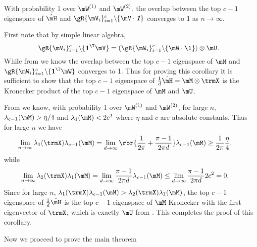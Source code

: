 \begin{corollary}
\label{cor:H-hat-eigenspace}
With probability 1 over $\mW^{(1)}$ and $\mW^{(2)}$, the overlap between the top $c-1$ eigenspace of $\hat\mH$ and $\gR\{\mV_i\}_{i=1}^c\backslash\{\mV\cdot\emph{\textbf{1}}\}$ converges to 1 as $n\to\infty$.
\end{corollary}
\begin{proofof}{}
First note that by simple linear algebra,
\begin{equation}
\gR\{\mV_i\}_{i=1}^c\backslash\{\textbf{1}^\T\mV\}=(\gR\{\mW_i\}_{i=1}^c\backslash\{\mW\cdot\1\})\otimes \mU.
\end{equation}
While from  we know the overlap between the top $c-1$ eigenspace of $\mM$ and $\gR\{\mW_i\}_{i=1}^c\backslash\{\textbf{1}^\T\mW\}$ converges to 1. Thus for proving this corollary it is sufficient to show that the top $c-1$ eigenspace of $\frac1d\hat\mH = \mM\otimes \trmX$ is the Kronecker product of the top $c-1$ eigenspace of $\mM$ and $\mU$.

From  we know, with probability 1 over $\mW^{(1)}$ and $\mW^{(2)}$, for large $n$, $\lambda_{c-1}(\mM)>\eta/4$ and $\lambda_1(\mM)<2c^2$ where $\eta$ and $c$ are absolute constants. Thus for large $n$ we have \begin{equation}
\begin{split}
\lim_{n\to\infty}\lambda_1(\trmX)\lambda_{c-1}(\mM) &= \lim_{d\to\infty}\rbr{\frac{1}{2\pi}+\frac{\pi-1}{2\pi d}}\lambda_{c-1}(\mM)\geq \frac{1}{2\pi}\frac{\eta}{4}.
\end{split}
\end{equation}
while
\begin{equation}
\begin{split}
\lim_{n\to\infty}\lambda_2(\trmX)\lambda_1(\mM) &= \lim_{d\to\infty}\frac{\pi-1}{2\pi d}\lambda_{c-1}(\mM)\leq \lim_{d\to\infty}\frac{\pi-1}{2\pi d}2c^2=0.
\end{split}
\end{equation}
Since for large $n$, $\lambda_1(\trmX)\lambda_{c-1}(\mM) > \lambda_2(\trmX)\lambda_1(\mM)$, the top $c-1$ eigenspace of $\frac1d\hat\mH$ is the top $c-1$ eigenspace of $\mM$ Kronecker with the first eigenvector of $\trmX$, which is exactly $\mU$ from . This completes the proof of this corollary.

\end{proofof}

Now we proceed to prove the main theorem

